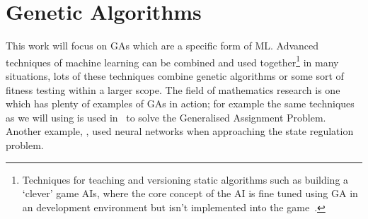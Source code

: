 \section{Genetic Algorithms}
This work will focus on GAs which are a specific form of ML.
Advanced techniques of machine learning can be combined and used together\footnote{Techniques for teaching and versioning static algorithms such as building a `clever' game AIs, where the core concept of the AI is fine tuned using GA in an development environment but isn't implemented into the game~\cite{bakkes2009rapid}.} in many situations, lots of these techniques combine genetic algorithms or some sort of fitness testing within a larger scope.
The field of mathematics research is one which has plenty of examples of GAs in action;
for example the same techniques as we will using is used in~\cite{chu1997genetic} to solve the Generalised Assignment Problem.
Another example, \cite{bhanu1995adaptive}, used neural networks when approaching the state regulation problem.

